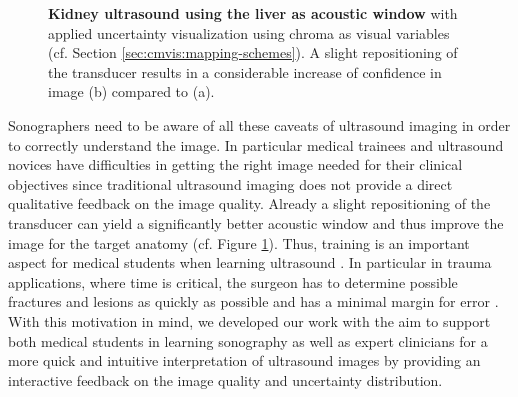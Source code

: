 \begin{figure}[ht]
	\centering
	\qquad
	\caption{
		\textbf{Kidney ultrasound using the liver as acoustic window} with applied uncertainty visualization using chroma as visual variables (cf. Section \ref{sec:cmvis:mapping-schemes}).
		A slight repositioning of the transducer results in a considerable increase of confidence in image (b) compared to (a).}
	\label{fig:cmvis:kidney_acoustic_window}
\end{figure}

Sonographers need to be aware of all these caveats of ultrasound imaging in order to correctly understand the image.
In particular medical trainees and ultrasound novices have difficulties in getting the right image needed for their clinical objectives since traditional ultrasound imaging does not provide a direct qualitative feedback on the image quality.
Already a slight repositioning of the transducer can yield a significantly better acoustic window and thus improve the image for the target anatomy (cf. Figure \ref{fig:cmvis:kidney_acoustic_window}).
Thus, training is an important aspect for medical students when learning ultrasound \cite{Butter:2007:UsTraining}.
In particular in trauma applications, where time is critical, the surgeon has to determine possible fractures and lesions as quickly as possible and has a minimal margin for error \cite{Knudtson:2004:TraumaSuite}.
With this motivation in mind, we developed our work with the aim to support both medical students in learning sonography as well as expert clinicians for a more quick and intuitive interpretation of ultrasound images by providing an interactive feedback on the image quality and uncertainty distribution.


